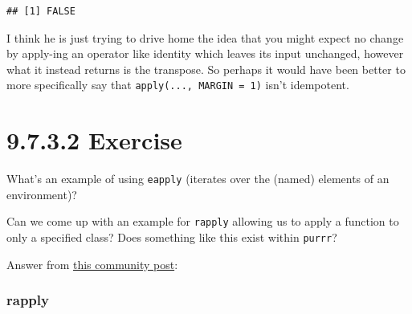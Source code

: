 \documentclass[]{book}
\newenvironment{Shaded}{\begin{snugshade}}{\end{snugshade}}
\newcommand{\ControlFlowTok}[1]{\textcolor[rgb]{0.13,0.29,0.53}{\textbf{#1}}}
\newcommand{\DataTypeTok}[1]{\textcolor[rgb]{0.13,0.29,0.53}{#1}}
\newcommand{\DecValTok}[1]{\textcolor[rgb]{0.00,0.00,0.81}{#1}}
\newcommand{\KeywordTok}[1]{\textcolor[rgb]{0.13,0.29,0.53}{\textbf{#1}}}
\newcommand{\NormalTok}[1]{#1}
\newcommand{\OperatorTok}[1]{\textcolor[rgb]{0.81,0.36,0.00}{\textbf{#1}}}
\newcommand{\StringTok}[1]{\textcolor[rgb]{0.31,0.60,0.02}{#1}}
\begin{document}
\begin{verbatim}
## [1] FALSE
\end{verbatim}

I think he is just trying to drive home the idea that you might expect no change by apply-ing an operator like identity which leaves its input unchanged, however what it instead returns is the transpose. So perhaps it would have been better to more specifically say that \texttt{apply(...,\ MARGIN\ =\ 1)} isn't idempotent.

\hypertarget{exercise-12}{%
\section*{9.7.3.2 Exercise}\label{exercise-12}}

What's an example of using \texttt{eapply} (iterates over the (named) elements of an environment)?

\begin{Shaded}
\end{Shaded}

Can we come up with an example for \texttt{rapply} allowing us to apply a function to only a specified class? Does something like this exist within \texttt{purrr}?

Answer from \href{https://community.rstudio.com/t/recursive-purrr-mutate-if/16638/7}{this community post}:

\hypertarget{rapply}{%
\subsubsection{rapply}\label{rapply}}

\begin{Shaded}
\end{Shaded}
\end{document}
